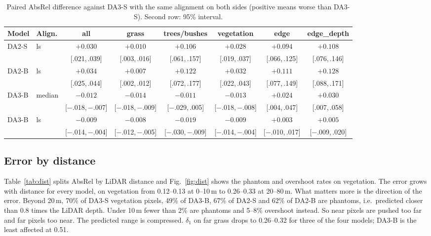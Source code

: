 \documentclass[conference]{IEEEtran}
\newcommand{\ci}[2]{{\scriptsize[#1,\,#2]}}
\newcommand{\absrel}{AbsRel}
\newcommand{\dOne}{$\delta_1$}
\begin{document}
\begin{table}[!t]
\caption{Paired \absrel{} difference against DA3-S with the same alignment on both sides (positive means worse than DA3-S). Second row: 95\% interval.}
\label{tab:paired}
\centering
\small
\setlength{\tabcolsep}{7pt}
\begin{tabular}{llcccccc}
\toprule
Model & Align. & all & grass & trees/bushes & vegetation & edge & edge\_depth \\
\midrule
DA2-S & ls & $+0.030$ & $+0.010$ & $+0.106$ & $+0.028$ & $+0.094$ & $+0.108$ \\
 & & \ci{.021}{.039} & \ci{.003}{.016} & \ci{.061}{.157} & \ci{.019}{.037} & \ci{.066}{.125} & \ci{.076}{.146} \\
DA2-B & ls & $+0.034$ & $+0.007$ & $+0.122$ & $+0.032$ & $+0.111$ & $+0.128$ \\
 & & \ci{.025}{.044} & \ci{.002}{.012} & \ci{.072}{.177} & \ci{.022}{.043} & \ci{.077}{.149} & \ci{.088}{.171} \\
\addlinespace[2pt]
DA3-B & median & $-0.012$ & $-0.014$ & $-0.011$ & $-0.013$ & $+0.024$ & $+0.030$ \\
 & & \ci{$-$.018}{$-$.007} & \ci{$-$.018}{$-$.009} & \ci{$-$.029}{.005} & \ci{$-$.018}{$-$.008} & \ci{.004}{.047} & \ci{.007}{.058} \\
DA3-B & ls & $-0.009$ & $-0.008$ & $-0.019$ & $-0.009$ & $+0.003$ & $+0.005$ \\
 & & \ci{$-$.014}{$-$.004} & \ci{$-$.012}{$-$.005} & \ci{$-$.030}{$-$.009} & \ci{$-$.014}{$-$.004} & \ci{$-$.010}{.017} & \ci{$-$.009}{.020} \\
\bottomrule
\end{tabular}
\end{table}

\subsection{Error by distance}\label{sec:dist}
Table~\ref{tab:dist} splits \absrel{} by LiDAR distance and Fig.~\ref{fig:dist} shows the phantom and overshoot rates on vegetation. The error grows with distance for every model, on vegetation from 0.12--0.13 at 0--10\,m to 0.26--0.33 at 20--80\,m. What matters more is the direction of the error. Beyond 20\,m, 70\% of DA3-S vegetation pixels, 49\% of DA3-B, 67\% of DA2-S and 62\% of DA2-B are phantoms, i.e.\ predicted closer than 0.8 times the LiDAR depth. Under 10\,m fewer than 2\% are phantoms and 5--8\% overshoot instead. So near pixels are pushed too far and far pixels too near. The predicted range is compressed. \dOne{} on far grass drops to 0.26--0.32 for three of the four models; DA3-B is the least affected at 0.51.
\end{document}

